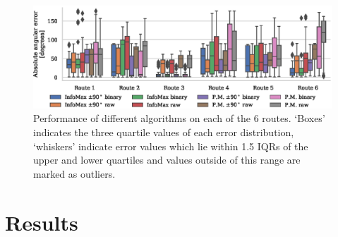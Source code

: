 \documentclass[letterpaper]{article}
\begin{document}
\begin{figure}[t]
    \centering
    \includegraphics{figures/route_benchmark.eps}
    \caption{Performance of different algorithms on each of the 6 routes.
    `Boxes' indicates the three quartile values of each error distribution, `whiskers' indicate error values which lie within \num{1.5} IQRs of the upper and lower quartiles and values outside of this range are marked as outliers.}
    \label{fig:route_benchmark}
\end{figure}

\section{Results}
\end{document}
